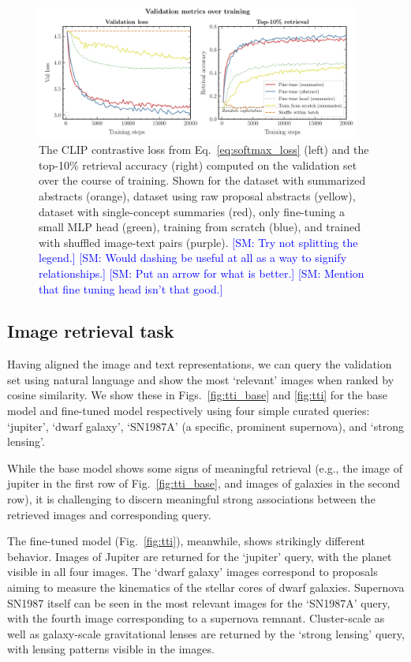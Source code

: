 \documentclass[10pt]{article} %
\newcommand{\SM}[1]{\textcolor{blue}{[SM: #1]}}
\begin{document}
\begin{figure}[!h]
  \includegraphics[width=0.95\textwidth]{plots/val_metrics.pdf}
  \caption{The CLIP contrastive loss from Eq.~\ref{eq:softmax_loss} (left) and the top-10\% retrieval accuracy (right) computed on the validation set over the course of training. Shown for the dataset with summarized abstracts (orange), dataset using raw proposal abstracts (yellow), dataset with single-concept summaries (red), only fine-tuning a small MLP head (green), training from scratch (blue), and trained with shuffled image-text pairs (purple). \SM{Try not splitting the legend.} \SM{Would dashing be useful at all as a way to signify relationships.} \SM{Put an arrow for what is better.} \SM{Mention that fine tuning head isn't that good.}}
  \label{fig:retrieval_acc}
  \end{figure}

\subsection{Image retrieval task}

Having aligned the image and text representations, we can query the validation set using natural language and show the most `relevant' images when ranked by cosine similarity.
%
We show these in Figs.~\ref{fig:tti_base} and \ref{fig:tti} for the base model and fine-tuned model respectively using four simple curated queries: `jupiter', `dwarf galaxy', `SN1987A' (a specific, prominent supernova), and `strong lensing'.

While the base model shows some signs of meaningful retrieval (e.g., the image of jupiter in the first row of Fig.~\ref{fig:tti_base}, and images of galaxies in the second row), it is challenging to discern meaningful strong associations between the retrieved images and corresponding query.

The fine-tuned model (Fig.~\ref{fig:tti}), meanwhile, shows strikingly different behavior.
%
%
Images of Jupiter are returned for the `jupiter' query, with the planet visible in all four images.
%
The `dwarf galaxy' images correspond to proposals aiming to measure the kinematics of the stellar cores of dwarf galaxies.
%
Supernova SN1987 itself can be seen in the most relevant images for the `SN1987A' query, with the fourth image corresponding to a supernova remnant.
%
Cluster-scale as well as galaxy-scale gravitational lenses are returned by the `strong lensing' query, with lensing patterns visible in the images.
\end{document}
